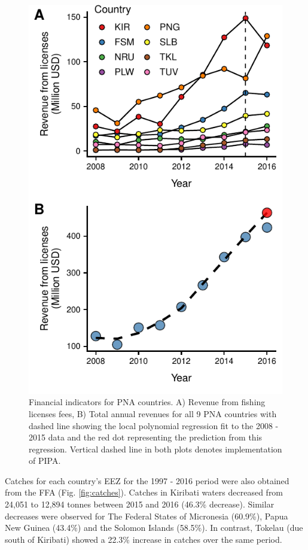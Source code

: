 \documentclass[9p,twocolumn,twoside,lineno]{pnas-new}
\begin{document}
\begin{figure}
\centering
	\includegraphics{img/revenues.pdf}
	\caption{\label{fig:revenues}Financial indicators for PNA countries. A) Revenue from fishing licenses fees, B) Total annual revenues for all 9 PNA countries with dashed line showing the local polynomial regression fit to the 2008 - 2015 data and the red dot representing the prediction from this regression. Vertical dashed line in both plots denotes implementation of PIPA.}
\end{figure}

Catches for each country's EEZ for the 1997 - 2016 period were also obtained from the FFA (Fig. \ref{fig:catches}). Catches in Kiribati waters decreased from 24,051 to 12,894 tonnes between 2015 and 2016 (46.3\% decrease). Similar decreases were observed for The Federal States of Micronesia (60.9\%), Papua New Guinea (43.4\%) and the Solomon Islands (58.5\%). In contrast, Tokelau (due south of Kiribati) showed a 22.3\% increase in catches over the same period.
\end{document}
